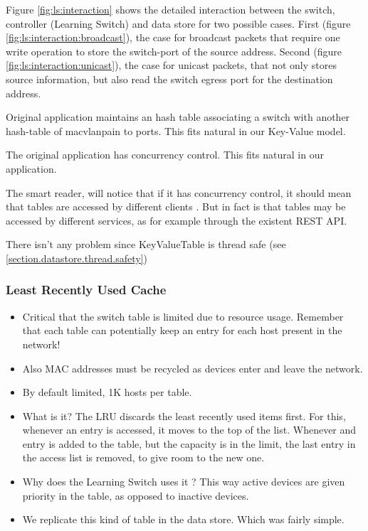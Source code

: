 Figure \ref{fig:ls:interaction}  shows the detailed interaction between the
switch, controller (Learning Switch) and data store for two possible
cases. First (figure \ref{fig:ls:interaction:broadcast}), the case for broadcast packets that require
one write operation to store the switch-port  of the
source address. Second (figure \ref{fig:ls:interaction:unicast}),   the case for unicast
packets, that not only stores source information, but also read the
switch egress port for the destination address.  


\begin{description}
\item Original application maintains an hash table associating a
  switch with another hash-table  of macvlanpain to ports. This fits
  natural in our Key-Value model.
\item The original application has concurrency control. This fits
  natural in our application.
\item  The smart reader, will notice that if it has concurrency
  control, it should mean that tables are accessed by different
  clients . But in fact is that tables may be accessed by different
  services, as for example through the existent REST API. 
\item There isn't any problem since KeyValueTable is  thread safe (see
  \ref{section.datastore.thread.safety}) 

\end{description}

\subsubsection{Least Recently Used Cache}
\begin{itemize}
\item Critical that the switch table is limited due to resource
  usage. Remember that each table can potentially keep an entry for
  each host present in the network! 
\item Also MAC addresses must be recycled as devices enter and leave
  the network. 
\item By default limited, 1K hosts per table. 

\item What is it? The LRU discards the least recently used items
  first. For this, whenever an entry is accessed, it moves to the top
  of the list. Whenever and entry is added to the table, but the
  capacity is in the limit, the last entry in the access list is
  removed, to give room to the new one.

\item Why does the Learning Switch uses it ?  This way active devices
  are given priority in the table, as opposed to inactive devices. 
\item  We replicate this kind of table in the data store. Which was fairly simple. 
\end{itemize}

